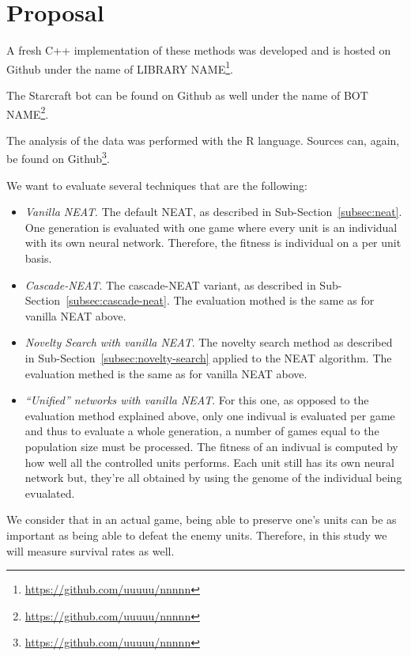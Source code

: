 \section{Proposal}\label{section:proposal}

A fresh C++ implementation of these methods was developed and is hosted on Github under the name of LIBRARY
NAME\footnote{\url{https://github.com/uuuuu/nnnnn}}.%

The Starcraft bot can be found on Github as well under the name of
BOT NAME\footnote{\url{https://github.com/uuuuu/nnnnn}}.%

The analysis of the data was performed with the R language. Sources can, again,
be found on Github\footnote{\url{https://github.com/uuuuu/nnnnn}}.%

We want to evaluate several techniques that are the following:
\begin{itemize}
    \item \emph{Vanilla NEAT}. The default NEAT, as described in Sub-Section~\ref{subsec:neat}. One generation is evaluated with one game
        where every unit is an individual with its own neural network. Therefore, the fitness is individual on a per unit basis.
    \item \emph{Cascade-NEAT}. The cascade-NEAT variant, as described in Sub-Section~\ref{subsec:cascade-neat}.
        The evaluation mothed is the same as for vanilla NEAT above.
    \item \emph{Novelty Search with vanilla NEAT}. The novelty search method as described in Sub-Section~\ref{subsec:novelty-search} applied to the NEAT algorithm.
        The evaluation methed is the same as for vanilla NEAT above.
    \item \emph{``Unified'' networks with vanilla NEAT}. For this one, as opposed to the evaluation method explained above, only one indivual is
        evaluated per game and thus to evaluate a whole generation, a number of games equal to the population size must be processed.
        The fitness of an indivual is computed by how well all the controlled units performs. Each unit still has its own neural network
        but, they're all obtained by using the genome of the individual being evualated.
\end{itemize}

We consider that in an actual game, being able to preserve one's
units can be as important as being able to defeat the enemy units.
Therefore, in this study we will measure survival rates as well.

